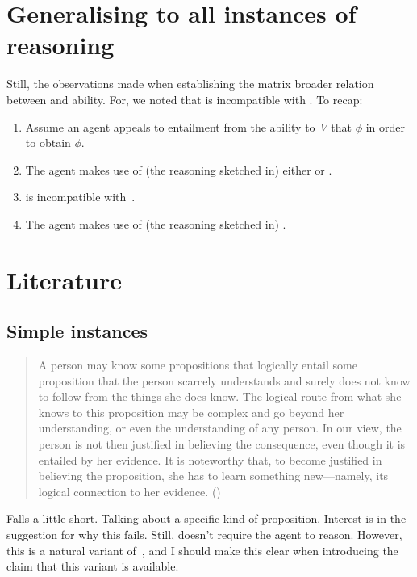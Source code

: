 \section{Generalising \ESU{} to all instances of reasoning}
\label{sec:generalising-ura-all}

\begin{note}
  Still, the observations made when establishing the matrix broader relation between \ESU{} and ability.
  For, we noted that \ESU{} is incompatible with \WR{}.
  To recap:
  \begin{enumerate}[label=(B\arabic*), ref=(B\arabic*)]
  \item Assume an agent appeals to entailment from the ability to \emph{V} that \(\phi\) in order to obtain \(\phi\).
  \item The agent makes use of (the reasoning sketched in) either \AR{} or \WR{}.
  \item \WR{} is incompatible with~\ESU{}.
  \item The agent makes use of (the reasoning sketched in) \AR{}.
  \end{enumerate}
\end{note}



\section{Literature}
\label{sec:literature}

\subsection{Simple instances}
\label{sec:simple-instances}

\begin{quote}
  A person may know some propositions that logically entail some proposition that the person scarcely understands and surely does not know to follow from the things she does know.
  The logical route from what she knows to this proposition may be complex and go beyond her understanding, or even the understanding of any person.
  In our view, the person is not then justiﬁed in believing the consequence, even though it is entailed by her evidence.
  It is noteworthy that, to become justiﬁed in believing the proposition, she has to learn something new---namely, its logical connection to her evidence.\nolinebreak
  \mbox{}\hfill\mbox{(\citeyear[94]{Conee:wk})}
\end{quote}
Falls a little short.
Talking about a specific kind of proposition.
Interest is in the suggestion for why this fails.
Still, doesn't require the agent to reason.
However, this is a natural variant of~\ESU{}, {\color{red} and I should make this clear when introducing the claim that this variant is available}.


